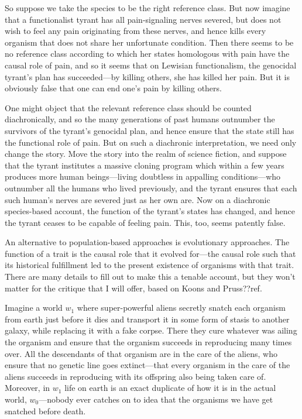 So suppose we take the species to be the right reference class. But now imagine that a functionalist tyrant has 
all pain-signaling nerves severed, but does not wish to feel any pain originating from these nerves, and hence 
kills every organism that does not share  her unfortunate condition. Then there seems to be no reference 
class according to which her states homologous with pain have the causal role of pain, and so it seems that on 
Lewisian functionalism, the genocidal tyrant's plan has succeeded---by killing others, she has killed her pain.
But it is obviously false that one can end one's pain by killing others.

One might object that the relevant reference class should be counted diachronically, and so the many generations of 
past humans outnumber the survivors of the tyrant's genocidal plan, and hence ensure that the state still has the 
functional role of pain. But on such a diachronic interpretation, we need only change the story. Move the story into
the realm of science fiction, and suppose that the tyrant institutes a massive cloning program which within a few 
years produces more human beings---living doubtless in appalling conditions---who outnumber all the humans who lived
previously, and the tyrant ensures that each such human's nerves are severed just as her own are. Now on a diachronic
species-based account, the function of the tyrant's states has changed, and hence the tyrant ceases to be capable of 
feeling pain. This, too, seems patently false.

An alternative to population-based approaches is evolutionary approaches. The function of a trait is the
causal role that it evolved for---the causal role such that its historical fulfillment led to the present 
existence of organisms with that trait. There are many details to fill out to make this a tenable account,
but they won't matter for the critique that I will offer, based on Koons and Pruss??ref.  

Imagine a world $w_1$ where super-powerful aliens secretly snatch each organism from earth just before it dies and transport it in
some form of stasis to another galaxy, while replacing it with a fake corpse. There they cure whatever 
was ailing the organism and ensure that the organism succeeds in reproducing many times over. All the descendants of that 
organism are in the care of the aliens, who ensure that no genetic line goes extinct---that every organism in 
the care of the aliens succeeds in reproducing with its offspring also being taken care of. Moreover, in $w_1$
life on earth is an exact duplicate of how it is in the actual world, $w_0$---nobody ever catches on to idea that the organisms we 
have get snatched before death.

